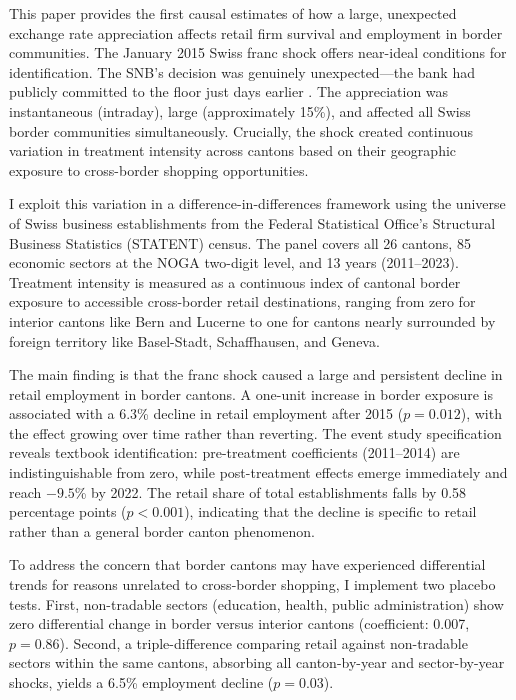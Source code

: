 \documentclass[12pt]{article}
\begin{document}
This paper provides the first causal estimates of how a large, unexpected exchange rate appreciation affects retail firm survival and employment in border communities. The January 2015 Swiss franc shock offers near-ideal conditions for identification. The SNB's decision was genuinely unexpected---the bank had publicly committed to the floor just days earlier \citep{Auer2015, Kaufmann2020}. The appreciation was instantaneous (intraday), large (approximately 15\%), and affected all Swiss border communities simultaneously. Crucially, the shock created continuous variation in treatment intensity across cantons based on their geographic exposure to cross-border shopping opportunities.

I exploit this variation in a difference-in-differences framework using the universe of Swiss business establishments from the Federal Statistical Office's Structural Business Statistics (STATENT) census. The panel covers all 26 cantons, 85 economic sectors at the NOGA two-digit level, and 13 years (2011--2023). Treatment intensity is measured as a continuous index of cantonal border exposure to accessible cross-border retail destinations, ranging from zero for interior cantons like Bern and Lucerne to one for cantons nearly surrounded by foreign territory like Basel-Stadt, Schaffhausen, and Geneva.

The main finding is that the franc shock caused a large and persistent decline in retail employment in border cantons. A one-unit increase in border exposure is associated with a 6.3\% decline in retail employment after 2015 ($p = 0.012$), with the effect growing over time rather than reverting. The event study specification reveals textbook identification: pre-treatment coefficients (2011--2014) are indistinguishable from zero, while post-treatment effects emerge immediately and reach $-9.5$\% by 2022. The retail share of total establishments falls by 0.58 percentage points ($p < 0.001$), indicating that the decline is specific to retail rather than a general border canton phenomenon.

To address the concern that border cantons may have experienced differential trends for reasons unrelated to cross-border shopping, I implement two placebo tests. First, non-tradable sectors (education, health, public administration) show zero differential change in border versus interior cantons (coefficient: 0.007, $p = 0.86$). Second, a triple-difference comparing retail against non-tradable sectors within the same cantons, absorbing all canton-by-year and sector-by-year shocks, yields a 6.5\% employment decline ($p = 0.03$).
\end{document}
